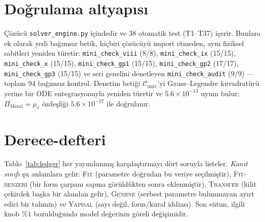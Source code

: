 \documentclass[12pt,a4paper]{article}
\begin{document}
\section{Doğrulama altyapısı}
Çözücü \texttt{solver\_engine.py} içindedir ve 38 otomatik test
(T1--T37) içerir. Bunlara ek olarak yedi bağımsız betik, hiçbiri çözücüyü
import etmeden, aynı fiziksel sabitleri yeniden türetir:
\texttt{mini\_check\_viii} (8/8), \texttt{mini\_check\_ix} (15/15),
\texttt{mini\_check\_x} (15/15), \texttt{mini\_check\_gp1} (15/15),
\texttt{mini\_check\_gp2} (17/17), \texttt{mini\_check\_gp3} (15/15) ve
seri genelini denetleyen \texttt{mini\_check\_audit} (9/9) --- toplam
94 bağımsız kontrol. Denetim betiği $\mathcal{C}_{\mathrm{univ}}$'yi
Gauss--Legendre kuvadratürü yerine bir ODE entegrasyonuyla yeniden
türetir ve $5.6\times10^{-13}$ uyum bulur; $\Pi_{\mathrm{Meral}} = \mu_s$
özdeşliği $5.6\times10^{-17}$ ile doğrulanır.

\section{Derece-defteri}
Tablo~\ref{tab:ledger} her yayımlanmış karşılaştırmayı dört soruyla
listeler. \emph{Kanıt sınıfı} şu anlamlara gelir: \textsc{Fit} (parametre
doğrudan bu veriye seçilmiştir), \textsc{Fit-benzeri} (bir form çarpanı
sapma görüldükten sonra eklenmiştir), \textsc{Transfer} (kilit çekirdek
başka bir alandan gelir), \textsc{Geniine} (serbest parametre
bulunmayan ayırt edici bir tahmin) ve \textsc{Yapısal} (sayı değil,
form/kural iddiası). Son sütun, ilgili knob $\%1$ bozulduğunda model
değerinin göreli değişimidir.
\end{document}
